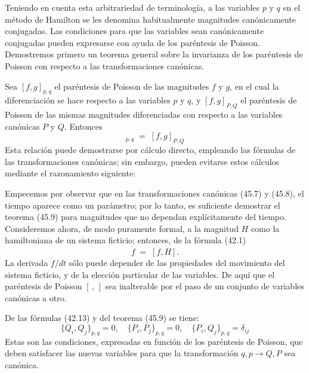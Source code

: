 \documentclass[12pt]{article}
\begin{document}
Teniendo en cuenta esta arbitrariedad de terminología, a las variables \(p\) y \(q\) en el método de Hamilton se les denomina habitualmente magnitudes canónicamente conjugadas. Las condiciones para que las variables sean canónicamente conjugadas pueden expresarse con ayuda de los paréntesis de Poisson. Demostremos primero un teorema general sobre la invarianza de los paréntesis de Poisson con respecto a las transformaciones canónicas.

Sea \([f,g]_{p,q}\) el paréntesis de Poisson de las magnitudes \(f\) y \(g\), en el cual la diferenciación se hace respecto a las variables \(p\) y \(q\), y \([f,g]_{P,Q}\) el paréntesis de Poisson de las mismas magnitudes diferenciadas con respecto a las variables canónicas \(P\) y \(Q\). Entonces
\begin{equation}
[f,g]_{p,q} \;=\;[f,g]_{P,Q} \tag{45.9}
\end{equation}
Esta relación puede demostrarse por cálculo directo, empleando las fórmulas de las transformaciones canónicas; sin embargo, pueden evitarse estos cálculos mediante el razonamiento siguiente:

Empecemos por observar que en las transformaciones canónicas (45.7) y (45.8), el tiempo aparece como un parámetro; por lo tanto, es suficiente demostrar el teorema (45.9) para magnitudes que no dependan explícitamente del tiempo. Consideremos ahora, de modo puramente formal, a la magnitud \(H\) como la hamiltoniana de un sistema ficticio; entonces, de la fórmula (42.1)
\[
\dot f \;=\;[f,H].
\]
La derivada \(\dot f/dt\) sólo puede depender de las propiedades del movimiento del sistema ficticio, y de la elección particular de las variables. De aquí que el paréntesis de Poisson \([\,,\,]\) sea inalterable por el paso de un conjunto de variables canónicas a otro.

De las fórmulas (42.13) y del teorema (45.9) se tiene:
\begin{equation}
\{Q_i,Q_j\}_{p,q} = 0,\quad
\{P_i,P_j\}_{p,q} = 0,\quad
\{P_i,Q_j\}_{p,q} = \delta_{ij}
\tag{45.10}
\end{equation}
Estas son las condiciones, expresadas en función de los paréntesis de Poisson, que deben satisfacer las nuevas variables para que la transformación \(q,p\to Q,P\) sea canónica.
\end{document}
